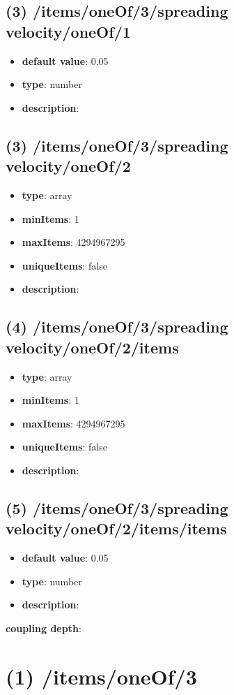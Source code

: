 \subsection{(3) /items/oneOf/3/spreading velocity/oneOf/1}
\begin{itemize}[leftmargin=3em]\item {\bf default value}: 0.05
\item {\bf type}: number
\item {\bf description}: 
\end{itemize}\subsection{(3) /items/oneOf/3/spreading velocity/oneOf/2}
\begin{itemize}[leftmargin=3em]\item {\bf type}: array
\item {\bf minItems}: 1
\item {\bf maxItems}: 4294967295
\item {\bf uniqueItems}: false
\item {\bf description}: 
\end{itemize}\subsection{(4) /items/oneOf/3/spreading velocity/oneOf/2/items}
\begin{itemize}[leftmargin=4em]\item {\bf type}: array
\item {\bf minItems}: 1
\item {\bf maxItems}: 4294967295
\item {\bf uniqueItems}: false
\item {\bf description}: 
\end{itemize}\subsection{(5) /items/oneOf/3/spreading velocity/oneOf/2/items/items}
\begin{itemize}[leftmargin=5em]\item {\bf default value}: 0.05
\item {\bf type}: number
\item {\bf description}: 
\end{itemize}\item {\bf coupling depth}: \section{(1) /items/oneOf/3}
